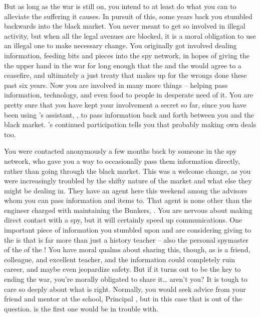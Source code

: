 \documentclass[char]{GL2020}
\begin{document}
But as long as the war is still on, you intend to at least do what you can to alleviate the suffering it causes. In pursuit of this, some years back you stumbled backwards into the black market. You never meant to get so involved in illegal activity, but when all the legal avenues are blocked, it is a moral obligation to use an illegal one to make necessary change. You originally got involved dealing information, feeding bits and pieces into the \pShip{} spy network, in hopes of giving the \pShippies{} the upper hand in the war for long enough that the \pFarm{} and the \pTech{} would agree to a ceasefire, and ultimately a just treaty that makes up for the wrongs done these past six years. Now you are involved in many more things -- helping pass information, technology, and even food to people in desperate need of it. You are pretty sure that you have kept your involvement a secret so far, since you have been using \cLibrarian{\full}'s assistant, \cLibAssist{\full}, to pass information back and forth between you and the black market. \cLibAssist{}'s continued participation tells you that \cLibAssist{\theyare} probably making \cLibAssist{\their} own deals too.

You were contacted anonymously a few months back by someone in the \pShip{} spy network, who gave you a way to occasionally pass them information directly, rather than going through the black market. This was a welcome change, as you were increasingly troubled by the shifty nature of the market and what else they might be dealing in. They have an agent here this weekend among the \pShip{} advisors whom you can pass information and items to. That agent is none other than the engineer charged with maintaining the Bunkers, \cBunker{\full}. You are nervous about making direct contact with a \pShip{} spy, but it will certainly speed up communications. One important piece of information you stumbled upon and are considering giving to the \pShip{} is that \cHistory{\full} is far more than just a history teacher –  \cHistory{\theyare} also the personal spymaster of the \cQueen{\Majesty} of the \pFarm{}! You have moral qualms about sharing this, though, as  \cHistory{} is a friend, colleague, and excellent teacher, and the information could completely ruin \cHistory{\their} career, and maybe even jeopardize \cHistory{\their} safety. But if it turns out to be the key to ending the war, you're morally obligated to share it\ldots{} aren't you? It is tough to care so deeply about what is right. Normally, you would seek advice from your friend and mentor at the school, Principal \cPrincipal{\full}, but in this case that is out of the question. \cPrincipal{} is the first one \cHistory{} would be in trouble with.
\end{document}
